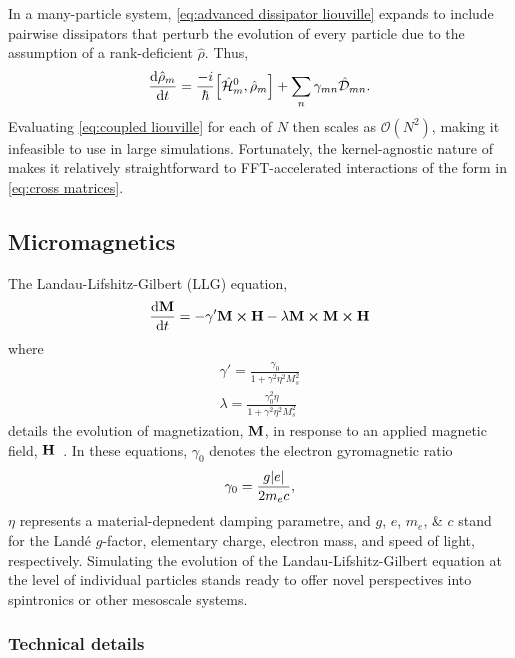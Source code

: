 In a many-particle system, \cref{eq:advanced dissipator liouville} expands to include  pairwise dissipators that perturb the evolution of every particle due to the assumption of a rank-deficient $\hat{\rho}$.
Thus,
\begin{equation}
  \dv{\hat\rho_m}{t} = \frac{-i}{\hbar} \commutator{\hat{\mathcal{H}}_m^0}{\hat{\rho}_m} + \sum_{n} \gamma_{mn} \hat{\mathcal{D}}_{mn}.
  \label{eq:coupled liouville}
\end{equation}
Evaluating \cref{eq:coupled liouville} for each of $N$ then scales as $\mathcal{O}(N^2)$, making it infeasible to use in large simulations.
Fortunately, the kernel-agnostic nature of \QuEST{} makes it relatively straightforward to FFT-accelerated interactions of the form in \cref{eq:cross matrices}.

\subsection{Micromagnetics}

The Landau-Lifshitz-Gilbert (LLG) equation,
\begin{equation}
  \dv{\vb{M}}{t} = -\gamma' \vb{M} \cp \vb{H} - \lambda \vb{M} \cp \vb{M} \cp \vb{H}
  \label{eq:llg}
\end{equation}
where
\begin{subequations}
\begin{align}
  \gamma' = \frac{\gamma_0}{1 + \gamma^2 \eta^2 M_s^2} \\
  \lambda = \frac{\gamma_0^2 \eta}{1 + \gamma^2 \eta^2  M_s^2}
\end{align}
\end{subequations}
details the evolution of magnetization, $\vb{M}$, in response to an applied magnetic field, $\vb{H}$~\cite{Aharoni2000}.
In these equations, $\gamma_0$ denotes the electron gyromagnetic ratio
\begin{equation}
  \gamma_0 = \frac{g \abs{e}}{2 m_e c},
  \label{eq:gyro}
\end{equation}
$\eta$ represents a material-depnedent damping parametre, and $g$, $e$, $m_e$, \& $c$ stand for the Land\'e $g$-factor, elementary charge, electron mass, and speed of light, respectively.
Simulating the evolution of the Landau-Lifshitz-Gilbert equation at the level of individual particles stands ready to offer novel perspectives into spintronics or other mesoscale systems.

\subsubsection{Technical details}

